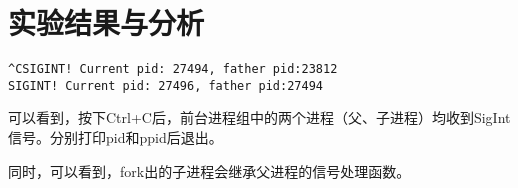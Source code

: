 \documentclass{ctexrep}
\begin{document}
\section{实验结果与分析}

\begin{verbatim}
^CSIGINT! Current pid: 27494, father pid:23812
SIGINT! Current pid: 27496, father pid:27494    
\end{verbatim}

可以看到，按下Ctrl+C后，前台进程组中的两个进程（父、子进程）均收到SigInt信号。分别打印pid和ppid后退出。

同时，可以看到，fork出的子进程会继承父进程的信号处理函数。

\end{document}
